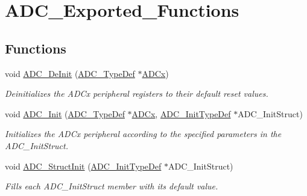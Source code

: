 \hypertarget{group___a_d_c___exported___functions}{}\section{A\+D\+C\+\_\+\+Exported\+\_\+\+Functions}
\label{group___a_d_c___exported___functions}
\subsection*{Functions}
\begin{DoxyCompactItemize}
\item 
void \mbox{\hyperlink{group___a_d_c___exported___functions_ga31fa6bc09de17125e9db2830ce77c09b}{A\+D\+C\+\_\+\+De\+Init}} (\mbox{\hyperlink{struct_a_d_c___type_def}{A\+D\+C\+\_\+\+Type\+Def}} $\ast$\mbox{\hyperlink{group___s_t_m32_f1_x_x___n_u_c_l_e_o___l_o_w___l_e_v_e_l___exported___constants_gab44c1065d38c298955fc028346984340}{A\+D\+Cx}})
\begin{DoxyCompactList}\small\item\em Deinitializes the A\+D\+Cx peripheral registers to their default reset values. \end{DoxyCompactList}\item 
void \mbox{\hyperlink{group___a_d_c___exported___functions_gabbab6038cf8691404350625e477254f9}{A\+D\+C\+\_\+\+Init}} (\mbox{\hyperlink{struct_a_d_c___type_def}{A\+D\+C\+\_\+\+Type\+Def}} $\ast$\mbox{\hyperlink{group___s_t_m32_f1_x_x___n_u_c_l_e_o___l_o_w___l_e_v_e_l___exported___constants_gab44c1065d38c298955fc028346984340}{A\+D\+Cx}}, \mbox{\hyperlink{struct_a_d_c___init_type_def}{A\+D\+C\+\_\+\+Init\+Type\+Def}} $\ast$A\+D\+C\+\_\+\+Init\+Struct)
\begin{DoxyCompactList}\small\item\em Initializes the A\+D\+Cx peripheral according to the specified parameters in the A\+D\+C\+\_\+\+Init\+Struct. \end{DoxyCompactList}\item 
void \mbox{\hyperlink{group___a_d_c___exported___functions_ga6c6e754d1d0a98d56e465efaf73272ec}{A\+D\+C\+\_\+\+Struct\+Init}} (\mbox{\hyperlink{struct_a_d_c___init_type_def}{A\+D\+C\+\_\+\+Init\+Type\+Def}} $\ast$A\+D\+C\+\_\+\+Init\+Struct)
\begin{DoxyCompactList}\small\item\em Fills each A\+D\+C\+\_\+\+Init\+Struct member with its default value. \end{DoxyCompactList}\item 

\end{DoxyCompactItemize}
